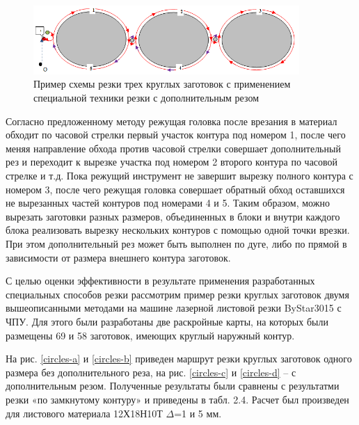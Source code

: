 \documentclass{article}
\begin{document}
\begin{figure}
  \begin{center}
  \includegraphics[width=0.9\textwidth]{3-extra.png}
  \caption{Пример схемы резки трех круглых заготовок с применением специальной техники резки с дополнительным резом}
  \label{3-extra}
  \end{center}
\end{figure}

Согласно предложенному методу режущая головка
после врезания в материал обходит по часовой
стрелки первый участок контура под номером 1,
после чего меняя направление обхода против
часовой стрелки совершает дополнительный рез и
переходит к вырезке участка под номером 2 второго
контура по часовой стрелке и т.д.
Пока режущий инструмент не завершит
вырезку полного контура с номером 3,
после чего режущая головка совершает обратный обход
оставшихся не вырезанных частей контуров под номерами 4 и 5.
Таким образом, можно вырезать заготовки разных размеров,
объединенных в блоки и внутри каждого блока реализовать
вырезку нескольких контуров с помощью одной точки врезки.
При этом дополнительный рез может быть выполнен по дуге,
либо по прямой в зависимости от размера внешнего контура заготовок.

С целью оценки эффективности в результате применения
разработанных специальных способов резки рассмотрим
пример резки круглых заготовок двумя вышеописанными
методами на машине лазерной листовой резки ByStar3015 с ЧПУ.
Для этого были разработаны две раскройные карты,
на которых были размещены 69 и 58 заготовок,
имеющих круглый наружный контур.

На рис. \ref{circles-a} и \ref{circles-b}
приведен маршрут резки
круглых заготовок одного размера без дополнительного реза,
на рис. \ref{circles-c} и \ref{circles-d} – с дополнительным резом.
Полученные результаты были сравнены с результатми
резки «по замкнутому контуру» и приведены в табл. 2.4.
Расчет был произведен для листового материала 12Х18Н10Т $\Delta$=1 и 5 мм.
\end{document}
